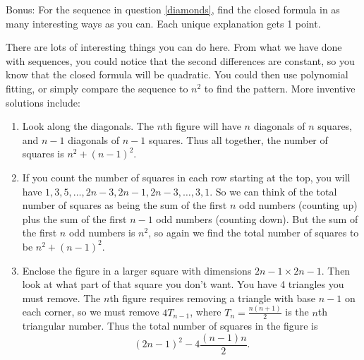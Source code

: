 \documentclass[12pt]{exam}
\begin{document}
\begin{questions}
	
	\bonusquestion[4] Bonus: For the sequence in question \ref{diamonds}, find the closed formula in as many interesting ways as you can.  Each unique explanation gets 1 point.

	\begin{solution}
	  There are lots of interesting things you can do here.  From what we have done with sequences, you could notice that the second differences are constant, so you know that the closed formula will be quadratic.  You could then use polynomial fitting, or simply compare the sequence to $n^2$ to find the pattern.  More inventive solutions include:
	  \begin{enumerate}
	    \item Look along the diagonals.  The $n$th figure will have $n$ diagonals of $n$ squares, and $n-1$ diagonals of $n-1$ squares.  Thus all together, the number of squares is $n^2 + (n-1)^2$.
	    \item If you count the number of squares in each row starting at the top, you will have $1, 3, 5, \ldots, 2n-3, 2n-1, 2n-3, \ldots, 3, 1$.  So we can think of the total number of squares as being the sum of the first $n$ odd numbers (counting up) plus the sum of the first $n-1$ odd numbers (counting down).  But the sum of the first $n$ odd numbers is $n^2$, so again we find the total number of squares to be $n^2 + (n-1)^2$.
	    \item Enclose the figure in a larger square with dimensions $2n-1 \times 2n-1$.  Then look at what part of that square you don't want.  You have 4 triangles you must remove.  The $n$th figure requires removing a triangle with base $n-1$ on each corner, so we must remove $4T_{n-1}$, where $T_n = \frac{n(n+1)}{2}$ is the $n$th triangular number.  Thus the total number of squares in the figure is
	    \[(2n-1)^2 - 4\frac{(n-1)n}{2}.\]
	  \end{enumerate}
	\end{solution}

\end{questions}
\end{document}
